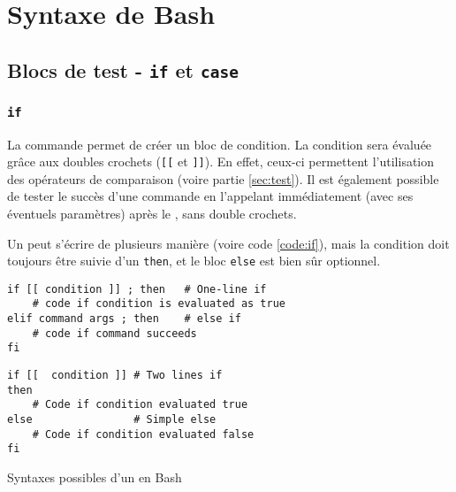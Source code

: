 \section{Syntaxe de Bash}

\subsection{Blocs de test - \texttt{if} et \texttt{case}}

\subsubsection{\texttt{if}} 
La commande  permet de créer un bloc de condition. La condition sera évaluée grâce aux doubles crochets (\texttt{[[} et \texttt{]]}). En effet, ceux-ci permettent l'utilisation des opérateurs de comparaison (voire partie \ref{sec:test}). Il est également possible de tester le succès d'une commande en l'appelant immédiatement (avec ses éventuels paramètres) après le , sans double crochets.

\begin{nscenter}
\end{nscenter}

Un  peut s'écrire de plusieurs manière (voire code \ref{code:if}), mais la condition doit toujours être suivie d'un \texttt{then}, et le bloc \texttt{else} est bien sûr optionnel.

\begin{code}
    \centering
    \noindent\begin{minipage}{.5\textwidth}
    \begin{verbatim}
if [[ condition ]] ; then   # One-line if
    # code if condition is evaluated as true
elif command args ; then    # else if
    # code if command succeeds
fi
\end{verbatim}
\end{minipage}\hfill
\begin{minipage}{.45\textwidth}
\begin{verbatim}
if [[  condition ]] # Two lines if
then
    # Code if condition evaluated true
else                # Simple else
    # Code if condition evaluated false
fi
\end{verbatim}
\end{minipage}\hfill
    \caption{Syntaxes possibles d'un  en Bash}
    \label{code:if}
\end{code}


